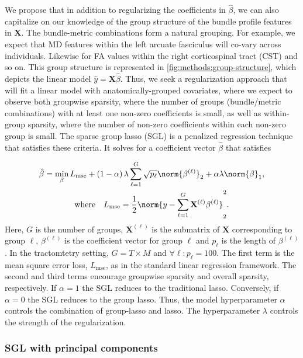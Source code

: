 \documentclass[10pt,letterpaper]{article}
\begin{document}
We propose that in addition to regularizing the coefficients in
$\hat{\beta}$, we can also capitalize on our knowledge of the group structure
of the bundle profile features in $\mathbf{X}$. The bundle-metric
combinations form a natural grouping. For example, we expect that MD features
within the left arcuate fasciculus will co-vary across individuals. Likewise
for FA values within the right corticospinal tract (CST) and so on. This
group structure is represented in \cref{fig:methods:group-structure}, which
depicts the linear model $\hat{y} = \mathbf{X} \hat{\beta}$. Thus, we seek a
regularization approach that will fit a linear model with
anatomically-grouped covariates, where we expect to observe both groupwise
sparsity, where the number of groups (bundle/metric combinations) with at
least one non-zero coefficients is small, as well as within-group sparsity,
where the number of non-zero coefficients within each non-zero group is
small. The sparse group lasso (SGL) is a penalized regression technique that
satisfies these criteria\cite{simon2013sparse}. It solves for a
coefficient vector $\hat{\beta}$ that satisfies

\begin{multline}
    \hat{\beta} = \min_\beta L_{\text{mse}}
    + \left( 1 - \alpha \right) \lambda \displaystyle \sum_{\ell = 1}^{G}
    \sqrt{p_\ell} \norm{\beta^{(\ell)}}_2
    + \alpha \lambda \norm{\beta}_1,\\%
    \text{where} \quad
    L_{\text{mse}} = \frac{1}{2}
    \norm{y - \displaystyle \sum_{\ell = 1}^{G}
    \mathbf{X}^{(\ell)} \beta^{(\ell)}}_2^2.
    \label{eq:sgl}
\end{multline}
Here, $G$ is the number of groups, $\mathbf{X}^{(\ell)}$ is the submatrix of
$\mathbf{X}$ corresponding to group $\ell$, $\beta^{(\ell)}$ is the
coefficient vector for group $\ell$ and $p_\ell$ is the length of
$\beta^{(\ell)}$. In the tractomtetry setting, $G = T \times M$ and $\forall
\ell: p_\ell = 100$. The first term is the mean square error loss,
$L_{\text{mse}}$, as in the standard linear regression framework. The second
and third terms encourage groupwise sparsity and overall sparsity,
respectively. If $\alpha = 1$ the SGL reduces to the traditional
lasso\cite{tibshirani1996regression}. Conversely, if $\alpha = 0$ the SGL
reduces to the group lasso\cite{yuan2006model}. Thus, the model
hyperparameter $\alpha$ controls the combination of group-lasso and lasso.
The hyperparameter $\lambda$ controls the strength of the regularization.

\subsubsection*{SGL with principal components}
\end{document}
